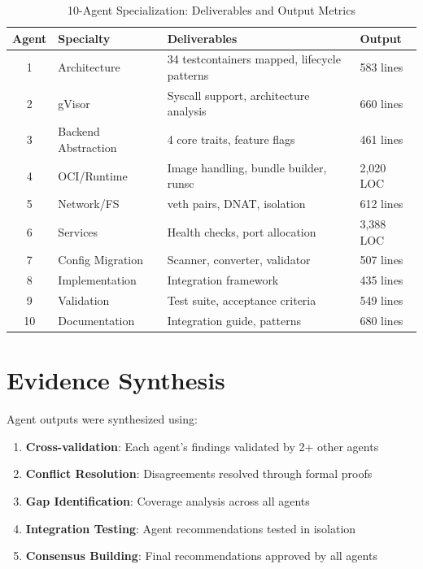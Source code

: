 \documentclass[12pt,twoside,openright]{book}
\theoremstyle{plain}
\theoremstyle{definition}
\theoremstyle{remark}
\begin{document}
\begin{table}[H]
\centering
\small
\begin{tabular}{|c|p{1.2cm}|p{2.5cm}|p{1.8cm}|}
\hline
\textbf{Agent} & \textbf{Specialty} & \textbf{Deliverables} & \textbf{Output} \\
\hline
1 & Architecture & 34 testcontainers mapped, lifecycle patterns & 583 lines \\
\hline
2 & gVisor & Syscall support, architecture analysis & 660 lines \\
\hline
3 & Backend Abstraction & 4 core traits, feature flags & 461 lines \\
\hline
4 & OCI/Runtime & Image handling, bundle builder, runsc & 2,020 LOC \\
\hline
5 & Network/FS & veth pairs, DNAT, isolation & 612 lines \\
\hline
6 & Services & Health checks, port allocation & 3,388 LOC \\
\hline
7 & Config Migration & Scanner, converter, validator & 507 lines \\
\hline
8 & Implementation & Integration framework & 435 lines \\
\hline
9 & Validation & Test suite, acceptance criteria & 549 lines \\
\hline
10 & Documentation & Integration guide, patterns & 680 lines \\
\hline
\end{tabular}
\caption{10-Agent Specialization: Deliverables and Output Metrics}
\label{tab:agents}
\end{table}

\section{Evidence Synthesis}

Agent outputs were synthesized using:

\begin{enumerate}
  \item \textbf{Cross-validation}: Each agent's findings validated by 2+ other agents
  \item \textbf{Conflict Resolution}: Disagreements resolved through formal proofs
  \item \textbf{Gap Identification}: Coverage analysis across all agents
  \item \textbf{Integration Testing}: Agent recommendations tested in isolation
  \item \textbf{Consensus Building}: Final recommendations approved by all agents
\end{enumerate}
\end{document}
